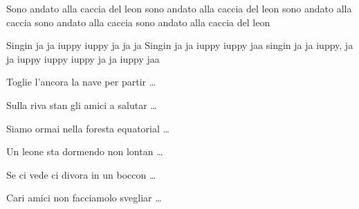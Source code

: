 
\beginverse

Sono andato alla caccia del leon 
sono andato alla caccia del leon 
sono andato alla caccia
sono andato alla caccia 
sono andato alla caccia del leon 

\endverse

\beginchorus

Singin ja ja iuppy iuppy ja ja ja 
Singin ja ja iuppy iuppy jaa
singin ja ja iuppy, ja ja iuppy
iuppy iuppy ja ja iuppy jaa

\endchorus

\chordsoff

\beginverse 

Toglie l'ancora la nave per partir  \dots

\endverse

\beginverse 

Sulla riva stan gli amici a salutar  \dots

\endverse

\beginverse 

Siamo ormai nella foresta equatorial  \dots

\endverse

\beginverse 

Un leone sta dormendo non lontan  \dots

\endverse

\beginverse 

Se ci vede ci divora in un boccon  \dots

\endverse

\beginverse 

Cari amici non facciamolo svegliar  \dots

\endverse

\endsong
